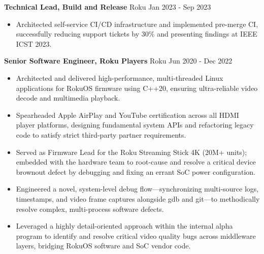 \textbf{Technical Lead, Build and Release} Roku \hfill Jan 2023 - Sep 2023

\begin{itemize} \itemsep -2pt
\item Architected self-service CI/CD infrastructure and implemented pre-merge CI, successfully reducing support tickets by 30\% and presenting findings at IEEE ICST 2023.
\end{itemize}

\textbf{Senior Software Engineer, Roku Players} Roku \hfill Jun 2020 - Dec 2022
\begin{itemize} \itemsep -2pt

        \item Architected and delivered high-performance, multi-threaded Linux applications for RokuOS firmware using C++20, ensuring ultra-reliable video decode and multimedia playback.

        \item Spearheaded Apple AirPlay and YouTube certification across all HDMI player platforms, designing fundamental system APIs and refactoring legacy code to satisfy strict third-party partner requirements.

        \item Served as Firmware Lead for the Roku Streaming Stick 4K (20M+ units); embedded with the hardware team to root-cause and resolve a critical device brownout defect by debugging and fixing an errant SoC power configuration.

        \item Engineered a novel, system-level debug flow—synchronizing multi-source logs, timestamps, and video frame captures alongside gdb and git—to methodically resolve complex, multi-process software defects.

        \item Leveraged a highly detail-oriented approach within the internal alpha program to identify and resolve critical video quality bugs across middleware layers, bridging RokuOS software and SoC vendor code.

\end{itemize}
